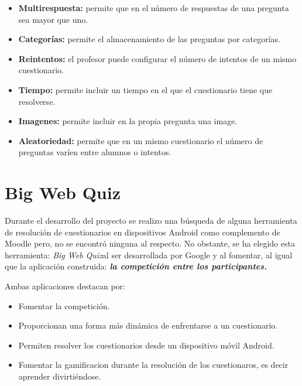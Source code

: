 \begin{itemize}
	\item \textbf{Multirespuesta:} permite que en el número de respuestas de una pregunta sea mayor que uno.
	
	\item \textbf{Categorías:} permite el almacenamiento de las preguntas por categorías.
	
	\item \textbf{Reintentos:} el profesor puede configurar el número de intentos de un mismo cuestionario.
	
	\item \textbf{Tiempo:} permite incluir un tiempo en el que el cuestionario tiene que resolverse.
	
	\item \textbf{Imagenes:} permite incluir en la propia pregunta una image.
	
	\item \textbf{Aleatoriedad:} permite que en un mismo cuestionario el número de preguntas varíen entre alumnos o intentos.
	
\end{itemize}


\section{Big Web Quiz}\cite{wiki:bigwebquiz}

Durante el desarrollo del proyecto se realizo una búsqueda de alguna herramienta de resolución de cuestionarios en dispositivos Android como complemento de Moodle pero, no se encontró ninguna al respecto. No obstante, se ha elegido esta herramienta: \emph{Big Web Quiz}al ser desarrollada por Google y al fomentar, al igual que la aplicación construida: \emph{\textbf{la competición entre los participantes.}}


Ambas aplicaciones destacan por:
\begin{itemize}
	\item Fomentar la competición.
	\item Proporcionan una forma más dinámica de enfrentarse a un cuestionario.
	\item Permiten resolver los cuestionarios desde un dispositivo móvil Android.
	\item Fomentar la gamificacion durante la resolución de los cuestionaros, es decir aprender divirtiéndose.
\end{itemize}
	

